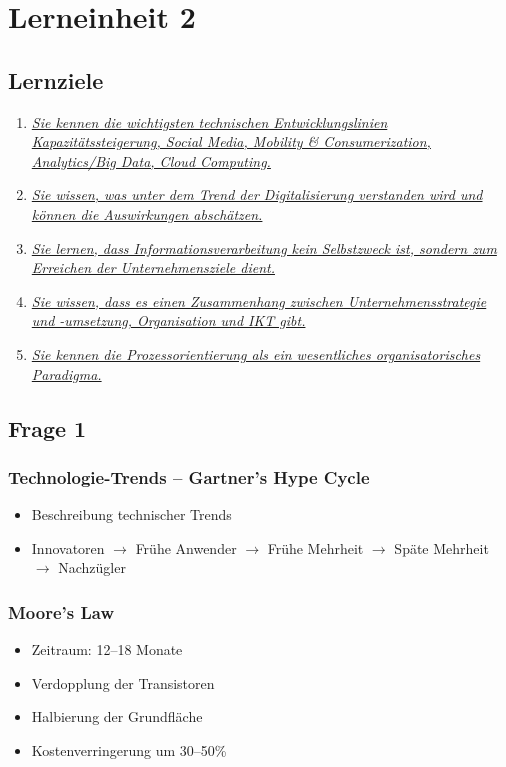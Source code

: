 \documentclass[a4paper]{article}
\begin{document}
\pagebreak

\section*{Lerneinheit 2}
\subsection*{Lernziele}
\begin{enumerate}
	\item \hyperref[le2-1]{\textit{Sie kennen die wichtigsten technischen Entwicklungslinien Kapazitätssteigerung, Social Media, Mobility \& Consumerization, Analytics/Big Data, Cloud Computing.}}
	\item \hyperref[le2-2]{\textit{Sie wissen, was unter dem Trend der Digitalisierung verstanden wird und können die Auswirkungen abschätzen.}}
	\item \hyperref[le2-3]{\textit{Sie lernen, dass Informationsverarbeitung kein Selbstzweck ist, sondern zum Erreichen der Unternehmensziele dient.}}
	\item \hyperref[le2-4]{\textit{Sie wissen, dass es einen Zusammenhang zwischen Unternehmensstrategie und -umsetzung, Organisation und IKT gibt.}}
	\item \hyperref[le2-5]{\textit{Sie kennen die Prozessorientierung als ein wesentliches organisatorisches Paradigma.}}
\end{enumerate}

\subsection*{Frage 1}
\label{le2-1}
\subsubsection*{Technologie-Trends -- Gartner's Hype Cycle}
\begin{itemize}
	\item Beschreibung technischer Trends
	\item Innovatoren $\rightarrow$ Frühe Anwender $\rightarrow$ Frühe Mehrheit $\rightarrow$ Späte Mehrheit $\rightarrow$ Nachzügler
\end{itemize}
\hrulefill
\subsubsection*{Moore's Law}
\begin{itemize}
	\item Zeitraum: 12--18 Monate
	\item Verdopplung der Transistoren
	\item Halbierung der Grundfläche
	\item Kostenverringerung um 30--50\%
\end{itemize}
\hrulefill
\end{document}
